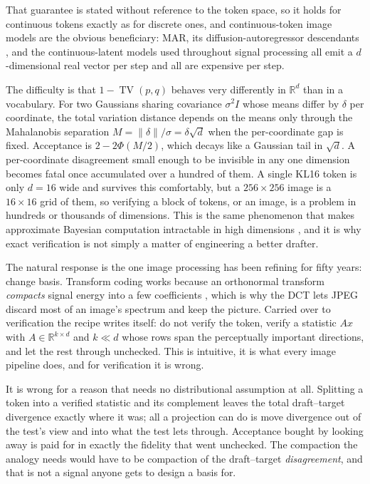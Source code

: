 \documentclass[10pt]{article}
\DeclareMathOperator{\TV}{TV}
\newcommand{\R}{\mathbb{R}}
\newcommand{\dd}{d}
\newcommand{\kk}{k}
\begin{document}
That guarantee is stated without reference to the token space, so it holds for continuous tokens
exactly as for discrete ones, and continuous-token image models are the obvious beneficiary: MAR, its
diffusion-autoregressor descendants \citep{li2025djepa}, and the continuous-latent models used
throughout signal processing all emit a $\dd$-dimensional real vector per step and all are expensive
per step.

The difficulty is that $1 - \TV(p,q)$ behaves very differently in $\R^\dd$ than in a vocabulary. For
two Gaussians sharing covariance $\sigma^2 I$ whose means differ by $\delta$ per coordinate, the
total variation distance depends on the means only through the Mahalanobis separation
$M = \|\delta\|/\sigma = \delta\sqrt{\dd}$ when the per-coordinate gap is fixed. Acceptance is
$2 - 2\Phi(M/2)$, which decays like a Gaussian tail in $\sqrt{\dd}$. A per-coordinate disagreement
small enough to be invisible in any one dimension becomes fatal once accumulated over a hundred of
them. A single KL16 token is only $\dd = 16$ wide and survives this comfortably, but a $256 \times
256$ image is a $16 \times 16$ grid of them, so verifying a block of tokens, or an image, is a
problem in hundreds or thousands of dimensions. This is the same phenomenon that makes approximate
Bayesian computation intractable in high dimensions \citep{fearnhead2012constructing}, and it is why
exact verification is not simply a matter of engineering a better drafter.

The natural response is the one image processing has been refining for fifty years: change basis.
Transform coding works because an orthonormal transform \emph{compacts} signal energy into a few
coefficients \citep{goyal2001transform}, which is why the DCT \citep{ahmed1974discrete} lets JPEG
\citep{wallace1992jpeg} discard most of an image's spectrum and keep the picture. Carried over to
verification the recipe writes itself: do not verify the token, verify a statistic $Ax$ with $A \in
\R^{\kk \times \dd}$ and $\kk \ll \dd$ whose rows span the perceptually important directions, and let
the rest through unchecked. This is intuitive, it is what every image pipeline does, and for
verification it is wrong.

It is wrong for a reason that needs no distributional assumption at all. Splitting a token into a
verified statistic and its complement leaves the total draft--target divergence exactly where it
was; all a projection can do is move divergence out of the test's view and into what the test lets
through. Acceptance bought by looking away is paid for in exactly the fidelity that went unchecked.
The compaction the analogy needs would have to be compaction of the draft--target
\emph{disagreement}, and that is not a signal anyone gets to design a basis for.
\end{document}
